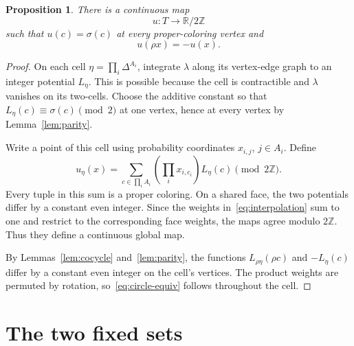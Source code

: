 \documentclass[11pt]{amsart}
\newtheorem{proposition}[theorem]{Proposition}
\theoremstyle{remark}
\numberwithin{equation}{section}
\newcommand{\R}{\mathbb R}
\newcommand{\Z}{\mathbb Z}
\begin{document}
\begin{proposition}\label{prop:circle}
There is a continuous map
\[
 u:T\longrightarrow\R/2\Z
\]
such that $u(c)=\sigma(c)$ at every proper-coloring vertex and
\begin{equation}\label{eq:circle-equiv}
 u(\rho x)=-u(x).
\end{equation}
\end{proposition}
\begin{proof}
On each cell $\eta=\prod_i\Delta^{A_i}$, integrate $\lambda$ along its vertex-edge graph to an integer potential $L_\eta$. This is possible because the cell is contractible and $\lambda$ vanishes on its two-cells. Choose the additive constant so that $L_\eta(c)\equiv\sigma(c)\pmod2$ at one vertex, hence at every vertex by Lemma~\ref{lem:parity}.

Write a point of this cell using probability coordinates $x_{i,j}$, $j\in A_i$. Define
\begin{equation}\label{eq:interpolation}
 u_\eta(x)=
 \sum_{c\in\prod_i A_i}
 \left(\prod_i x_{i,c_i}\right)L_\eta(c)
 \pmod{2\Z}.
\end{equation}
Every tuple in this sum is a proper coloring. On a shared face, the two potentials differ by a constant even integer. Since the weights in~\eqref{eq:interpolation} sum to one and restrict to the corresponding face weights, the maps agree modulo $2\Z$. Thus they define a continuous global map.

By Lemmas~\ref{lem:cocycle} and~\ref{lem:parity}, the functions $L_{\rho\eta}(\rho c)$ and $-L_\eta(c)$ differ by a constant even integer on the cell's vertices. The product weights are permuted by rotation, so~\eqref{eq:circle-equiv} follows throughout the cell.
\end{proof}

\section{The two fixed sets}\label{sec:fixed}
\end{document}
